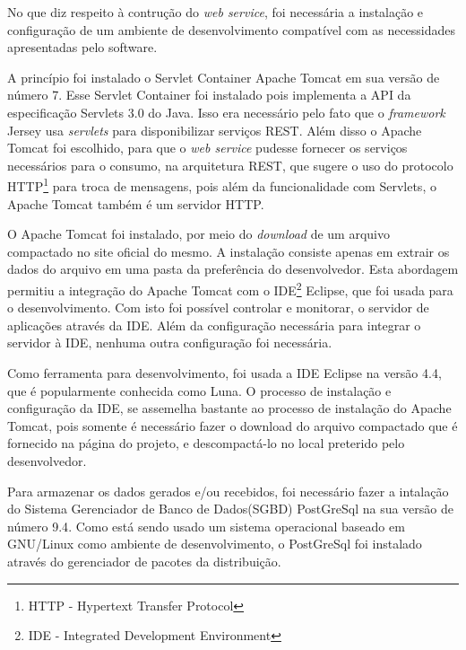 	
	\par No que diz respeito à contrução do \textit{web service}, foi necessária a
instalação e configuração de um ambiente de desenvolvimento compatível com as
necessidades apresentadas pelo software.

	\par A princípio foi instalado o Servlet Container Apache Tomcat em sua versão
de número {7}. Esse Servlet Container foi instalado pois implementa a API da
especificação Servlets {3.0} do Java. Isso era necessário pelo fato que o
\textit{framework} Jersey usa \textit{servlets} para disponibilizar serviços
REST. Além disso o Apache Tomcat foi escolhido, para que o \textit{web service}
pudesse fornecer os serviços necessários para o consumo, na arquitetura REST,
que sugere o uso do protocolo HTTP\footnote{HTTP - Hypertext Transfer Protocol}
para troca de mensagens, pois além da funcionalidade com Servlets, o Apache
Tomcat também é um servidor HTTP.
	
	\par O Apache Tomcat foi instalado, por meio do \textit{download} de um
arquivo compactado no site oficial do mesmo. A instalação consiste apenas em
extrair os dados do arquivo em uma pasta da preferência do desenvolvedor.
Esta abordagem permitiu a integração do Apache Tomcat com o
IDE\footnote{IDE - Integrated Development Environment}
Eclipse, que foi usada para o desenvolvimento. Com isto foi possível controlar
e monitorar, o servidor de aplicações através da IDE. Além da configuração
necessária para integrar o servidor à IDE, nenhuma outra configuração foi
necessária.

	\par Como ferramenta para desenvolvimento, foi usada a IDE Eclipse na versão
{4.4}, que é popularmente conhecida como Luna. O processo de instalação e
configuração da IDE, se assemelha bastante ao processo de instalação do Apache
Tomcat, pois somente é necessário fazer o download do arquivo compactado que é
fornecido na página do projeto, e descompactá-lo no local preterido pelo
desenvolvedor.

	\par Para armazenar os dados gerados e/ou recebidos, foi necessário fazer a
intalação do Sistema Gerenciador de Banco de Dados(SGBD) PostGreSql na sua
versão de número {9.4}. Como está sendo usado um sistema operacional baseado em
GNU/Linux como ambiente de desenvolvimento, o PostGreSql foi instalado através
do gerenciador de pacotes da distribuição.
 
